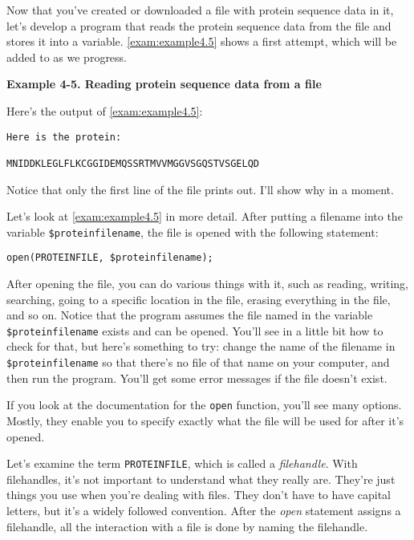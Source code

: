 Now that you've created or downloaded a file with protein sequence data in it, let's develop a program that reads the protein sequence data from the file and stores it into a variable. \autoref{exam:example4.5} shows a first attempt, which will be added to as we progress.

\textbf{Example 4-5. Reading protein sequence data from a file}



Here's the output of \autoref{exam:example4.5}:

\begin{lstlisting}
Here is the protein:

MNIDDKLEGLFLKCGGIDEMQSSRTMVVMGGVSGQSTVSGELQD
\end{lstlisting}

Notice that only the first line of the file prints out. I'll show why in a moment.

Let's look at \autoref{exam:example4.5} in more detail. After putting a filename into the variable \verb|$proteinfilename|, the file is opened with the following statement:

\begin{lstlisting}
open(PROTEINFILE, $proteinfilename);
\end{lstlisting}

After opening the file, you can do various things with it, such as reading, writing, searching, going to a specific location in the file, erasing everything in the file, and so on. Notice that the program assumes the file named in the variable \verb|$proteinfilename| exists and can be opened. You'll see in a little bit how to check for that, but here's something to try: change the name of the filename in \verb|$proteinfilename| so that there's no file of that name on your computer, and then run the program. You'll get some error messages if the file doesn't exist.

If you look at the documentation for the \verb|open| function, you'll see many options. Mostly, they enable you to specify exactly what the file will be used for after it's opened.

Let's examine the term \verb|PROTEINFILE|, which is called a \textit{filehandle}. With filehandles, it's not important to understand what they really are. They're just things you use when you're dealing with files. They don't have to have capital letters, but it's a widely followed convention. After the \textit{open} statement assigns a filehandle, all the interaction with a file is done by naming the filehandle.  

